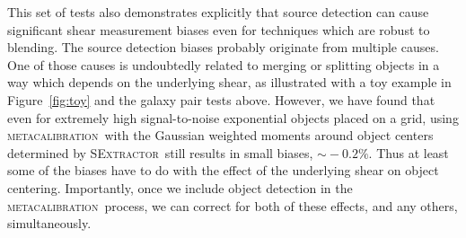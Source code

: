 \documentclass[fleqn,useAMS,usenatbib]{mnras}
\newcommand{\mcal}{\textsc{metacalibration}}
\newcommand{\sx}{\textsc{SExtractor}}
\begin{document}
This set of tests also demonstrates explicitly that source detection can cause
significant shear measurement biases even for techniques which are robust to
blending. The source detection biases probably originate from multiple causes.
One of those causes is undoubtedly related to merging or splitting objects in a
way which depends on the underlying shear, as illustrated with a toy example in
Figure~\ref{fig:toy} and the galaxy pair tests above. However, we have found
that even for extremely high signal-to-noise exponential objects placed on a
grid, using \mcal\ with the Gaussian weighted moments around object centers
determined by \sx\ still results in small biases, $\sim\!-0.2\%$. Thus at least
some of the biases have to do with the effect of the underlying shear on object
centering. Importantly, once we include object detection in the \mcal\ process,
we can correct for both of these effects, and any others, simultaneously.





\end{document}
